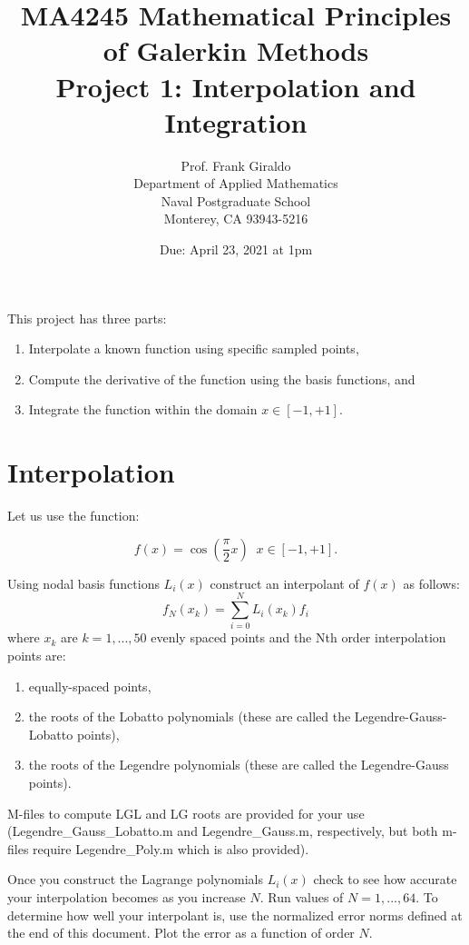 \documentclass[10pt]{article}
\newcommand{\be}{\begin{equation}}
\newcommand{\ee}{\end{equation}}
\begin{document}
\title{MA4245 Mathematical Principles of Galerkin Methods \\
Project 1: Interpolation and Integration}
\author{Prof. Frank Giraldo \\
Department of Applied Mathematics \\
Naval Postgraduate School \\
Monterey, CA 93943-5216}
\date{Due: April 23, 2021 at 1pm}

\maketitle

This project has three parts:
\begin{enumerate}
\item Interpolate a known function using specific sampled points, 
\item Compute the derivative of the function using the basis functions, and
\item Integrate the function within the domain $x\in [-1,+1]$.
\end{enumerate}

\section{Interpolation}
Let us use the function:

\be
f(x)=\cos \left( \frac{\pi}{2} x \right)\; \; x \in [-1,+1].
\ee

Using nodal basis functions $L_i(x)$ construct an interpolant of $f(x)$ as follows:
\be
f_N(x_k)=\sum_{i=0}^N L_i(x_k) f_i
\ee
where $x_k$ are $k=1,...,50$ evenly spaced points and the Nth order interpolation points are:
\begin{enumerate}
\item equally-spaced points, 
\item the roots of the Lobatto polynomials (these are called the Legendre-Gauss-Lobatto points),
\item the roots of the Legendre polynomials (these are called the Legendre-Gauss points).
\end{enumerate}
M-files to compute LGL and LG roots are provided for your use (Legendre\_Gauss\_Lobatto.m and Legendre\_Gauss.m, respectively, but both m-files require Legendre\_Poly.m which is 
also provided).

Once you construct the Lagrange polynomials $L_i(x)$ check to see how accurate your interpolation becomes as you increase $N$. Run values of 
$N=1,...,64$.
To determine how well your interpolant is, use the normalized error norms defined at the end of this document.
Plot the error as a function of order $N$.  
\end{document}

